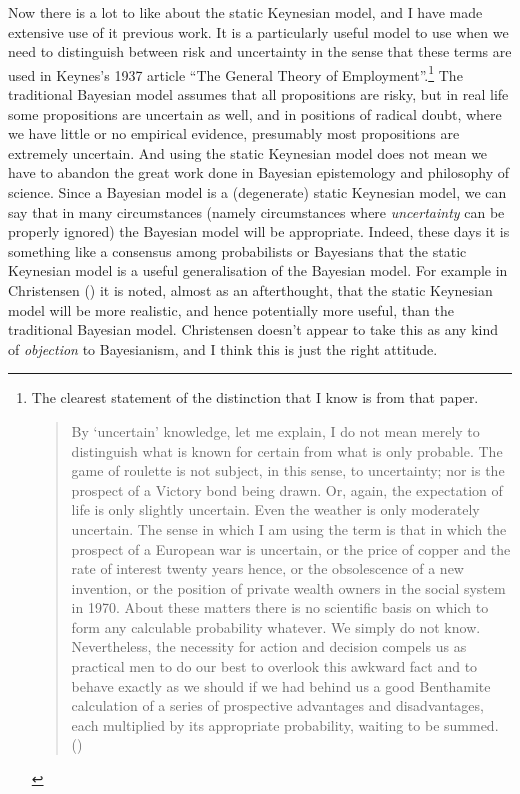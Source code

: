 \documentclass[
  11pt,
  letterpaper,
  DIV=11,
  numbers=noendperiod,
  oneside]{scrartcl}
\begin{document}
Now there is a lot to like about the static Keynesian model, and I have
made extensive use of it previous work. It is a particularly useful
model to use when we need to distinguish between risk and uncertainty in
the sense that these terms are used in Keynes's 1937 article ``The
General Theory of Employment''.\footnote{The clearest statement of the
  distinction that I know is from that paper.

  \begin{quote}
  By `uncertain' knowledge, let me explain, I do not mean merely to
  distinguish what is known for certain from what is only probable. The
  game of roulette is not subject, in this sense, to uncertainty; nor is
  the prospect of a Victory bond being drawn. Or, again, the expectation
  of life is only slightly uncertain. Even the weather is only
  moderately uncertain. The sense in which I am using the term is that
  in which the prospect of a European war is uncertain, or the price of
  copper and the rate of interest twenty years hence, or the
  obsolescence of a new invention, or the position of private wealth
  owners in the social system in 1970. About these matters there is no
  scientific basis on which to form any calculable probability whatever.
  We simply do not know. Nevertheless, the necessity for action and
  decision compels us as practical men to do our best to overlook this
  awkward fact and to behave exactly as we should if we had behind us a
  good Benthamite calculation of a series of prospective advantages and
  disadvantages, each multiplied by its appropriate probability, waiting
  to be summed. ()
  \end{quote}} The traditional Bayesian model assumes that all
propositions are risky, but in real life some propositions are uncertain
as well, and in positions of radical doubt, where we have little or no
empirical evidence, presumably most propositions are extremely
uncertain. And using the static Keynesian model does not mean we have to
abandon the great work done in Bayesian epistemology and philosophy of
science. Since a Bayesian model is a (degenerate) static Keynesian
model, we can say that in many circumstances (namely circumstances where
\emph{uncertainty} can be properly ignored) the Bayesian model will be
appropriate. Indeed, these days it is something like a consensus among
probabilists or Bayesians that the static Keynesian model is a useful
generalisation of the Bayesian model. For example in Christensen
() it is noted, almost as an
afterthought, that the static Keynesian model will be more realistic,
and hence potentially more useful, than the traditional Bayesian model.
Christensen doesn't appear to take this as any kind of \emph{objection}
to Bayesianism, and I think this is just the right attitude.
\end{document}
